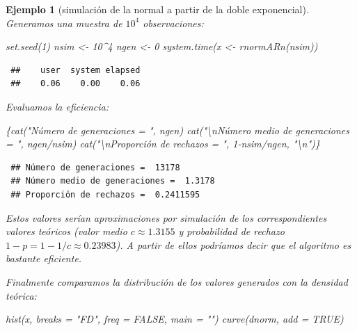 \documentclass[
]{book}
\newenvironment{Shaded}{\begin{snugshade}}{\end{snugshade}}
\newcommand{\AttributeTok}[1]{\textcolor[rgb]{0.77,0.63,0.00}{#1}}
\newcommand{\ConstantTok}[1]{\textcolor[rgb]{0.00,0.00,0.00}{#1}}
\newcommand{\DecValTok}[1]{\textcolor[rgb]{0.00,0.00,0.81}{#1}}
\newcommand{\FunctionTok}[1]{\textcolor[rgb]{0.00,0.00,0.00}{#1}}
\newcommand{\NormalTok}[1]{#1}
\newcommand{\OtherTok}[1]{\textcolor[rgb]{0.56,0.35,0.01}{#1}}
\newcommand{\SpecialCharTok}[1]{\textcolor[rgb]{0.00,0.00,0.00}{#1}}
\newcommand{\StringTok}[1]{\textcolor[rgb]{0.31,0.60,0.02}{#1}}
\theoremstyle{break}
\newtheorem{example}{Ejemplo}[chapter]
\theoremstyle{nonumberplain}
\begin{document}
\begin{example}[simulación de la normal a partir de la doble exponencial]
Generamos una muestra de \(10^4\) observaciones:

\begin{Shaded}
\begin{Highlighting}[]
\FunctionTok{set.seed}\NormalTok{(}\DecValTok{1}\NormalTok{)}
\NormalTok{nsim }\OtherTok{\textless{}{-}} \DecValTok{10}\SpecialCharTok{\^{}}\DecValTok{4}
\NormalTok{ngen }\OtherTok{\textless{}{-}} \DecValTok{0}
\FunctionTok{system.time}\NormalTok{(x }\OtherTok{\textless{}{-}} \FunctionTok{rnormARn}\NormalTok{(nsim))}
\end{Highlighting}
\end{Shaded}

\begin{verbatim}
 ##    user  system elapsed 
 ##    0.06    0.00    0.06
\end{verbatim}

Evaluamos la eficiencia:

\begin{Shaded}
\begin{Highlighting}[]
\NormalTok{\{}\FunctionTok{cat}\NormalTok{(}\StringTok{"Número de generaciones = "}\NormalTok{, ngen)}
\FunctionTok{cat}\NormalTok{(}\StringTok{"}\SpecialCharTok{\textbackslash{}n}\StringTok{Número medio de generaciones = "}\NormalTok{, ngen}\SpecialCharTok{/}\NormalTok{nsim)}
\FunctionTok{cat}\NormalTok{(}\StringTok{"}\SpecialCharTok{\textbackslash{}n}\StringTok{Proporción de rechazos = "}\NormalTok{, }\DecValTok{1}\SpecialCharTok{{-}}\NormalTok{nsim}\SpecialCharTok{/}\NormalTok{ngen, }\StringTok{"}\SpecialCharTok{\textbackslash{}n}\StringTok{"}\NormalTok{)\}}
\end{Highlighting}
\end{Shaded}

\begin{verbatim}
 ## Número de generaciones =  13178
 ## Número medio de generaciones =  1.3178
 ## Proporción de rechazos =  0.2411595
\end{verbatim}

Estos valores serían aproximaciones por simulación de los correspondientes valores teóricos (valor medio \(c \approx 1.3155\) y probabilidad de rechazo \(1 - p = 1 - 1/c \approx 0.23983\)).
A partir de ellos podríamos decir que el algoritmo es bastante eficiente.

Finalmente comparamos la distribución de los valores generados con la densidad teórica:

\begin{Shaded}
\begin{Highlighting}[]
\FunctionTok{hist}\NormalTok{(x, }\AttributeTok{breaks =} \StringTok{"FD"}\NormalTok{, }\AttributeTok{freq =} \ConstantTok{FALSE}\NormalTok{, }\AttributeTok{main =} \StringTok{""}\NormalTok{)}
\FunctionTok{curve}\NormalTok{(dnorm, }\AttributeTok{add =} \ConstantTok{TRUE}\NormalTok{)}
\end{Highlighting}
\end{Shaded}


\end{example}
\end{document}
